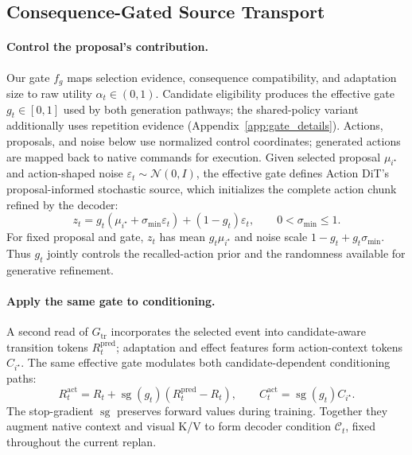 \subsection{Consequence-Gated Source Transport}
\label{sec:reuse}

\paragraph{Control the proposal's contribution.}
Our gate $f_g$ maps selection evidence, consequence compatibility, and adaptation size to raw utility $\alpha_t\in(0,1)$. Candidate eligibility produces the effective gate $g_t\in[0,1]$ used by both generation pathways; the shared-policy variant additionally uses repetition evidence (Appendix~\ref{app:gate_details}).
Actions, proposals, and noise below use normalized control coordinates; generated actions are mapped back to native commands for execution.
Given selected proposal $\mu_{i^\star}$ and action-shaped noise $\varepsilon_t\sim\mathcal N(0,I)$, the effective gate defines Action DiT's proposal-informed stochastic source, which initializes the complete action chunk refined by the decoder:
\begin{equation}
 z_t=g_t(\mu_{i^\star}+\sigma_{\min}\varepsilon_t)+(1-g_t)\varepsilon_t,
 \qquad 0<\sigma_{\min}\leq1.
 \label{eq:source}
\end{equation}
For fixed proposal and gate, $z_t$ has mean $g_t\mu_{i^\star}$ and noise scale $1-g_t+g_t\sigma_{\min}$.
Thus $g_t$ jointly controls the recalled-action prior and the randomness available for generative refinement.

\paragraph{Apply the same gate to conditioning.}
A second read of $G_{\mathrm{tr}}$ incorporates the selected event into candidate-aware transition tokens $R_t^{\mathrm{pred}}$; adaptation and effect features form action-context tokens $C_{i^\star}$.
The same effective gate modulates both candidate-dependent conditioning paths:
\begin{equation}
 R_t^{\mathrm{act}}=R_t+\operatorname{sg}(g_t)(R_t^{\mathrm{pred}}-R_t),\qquad
 C_t^{\mathrm{act}}=\operatorname{sg}(g_t)C_{i^\star}.
 \label{eq:conditions}
\end{equation}
The stop-gradient $\operatorname{sg}$ preserves forward values during training.
Together they augment native context and visual K/V to form decoder condition $\mathcal C_t$, fixed throughout the current replan.

